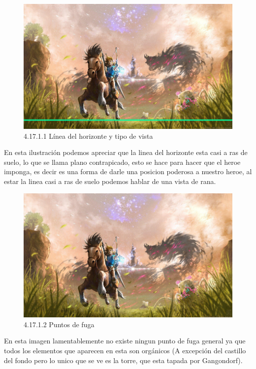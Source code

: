 \documentclass[12pt]{article}
\begin{document}
      \begin{figure}[H]
        \centering
        \includegraphics[scale=0.7]{images/Saúl/Sección 17/EA_img17_1Perspectiva_1LineaTierra-TipoVista.png}
        \caption{\small 4.17.1.1 Línea del horizonte y tipo de vista}
      \end{figure}
      En esta ilustración podemos apreciar que la linea del horizonte esta casi a ras de suelo, lo que se llama plano contrapicado, esto se hace para hacer que el heroe imponga, es decir es una forma de darle una posicion poderosa a nuestro heroe, al estar la linea casi a ras de suelo podemos hablar de una vista de rana.


      \begin{figure}[H]
        \centering
        \includegraphics[scale=0.7]{images/Saúl/Sección 17/EA_img17_1Perspectiva_2PuntosFuga.png}
        \caption{\small 4.17.1.2 Puntos de fuga}
      \end{figure}
      En esta imagen lamentablemente no existe ningun punto de fuga general ya que todos los elementos que aparecen en esta son orgánicos (A excepción del castillo del fondo pero lo unico que se ve es la torre, que esta tapada por Gangondorf).
\end{document}
